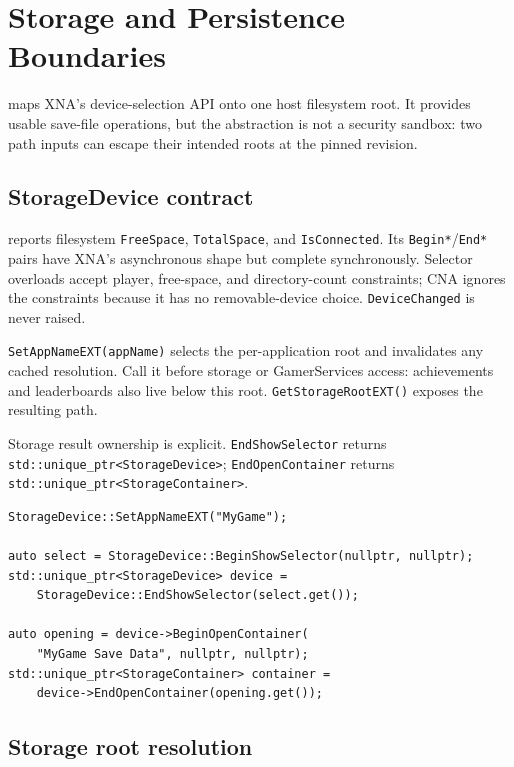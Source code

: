 \chapter{Storage and Persistence Boundaries}
\label{ch:storage}

 maps XNA's device-selection API onto one host
filesystem root. It provides usable save-file operations, but the abstraction is not a security
sandbox: two path inputs can escape their intended roots at the pinned revision.

\section{StorageDevice contract}

 reports filesystem \texttt{FreeSpace}, \texttt{TotalSpace}, and
\texttt{IsConnected}. Its \texttt{Begin*}/\texttt{End*} pairs have XNA's asynchronous shape but
complete synchronously. Selector overloads accept player, free-space, and directory-count
constraints; CNA ignores the constraints because it has no removable-device choice.
\texttt{DeviceChanged} is never raised.

\texttt{SetAppNameEXT(appName)} selects the per-application root and invalidates any cached
resolution. Call it before storage or GamerServices access: achievements and leaderboards also
live below this root. \texttt{GetStorageRootEXT()} exposes the resulting path.

Storage result ownership is explicit. \texttt{EndShowSelector} returns
\texttt{std::unique\_ptr<StorageDevice>}; \texttt{EndOpenContainer} returns
\texttt{std::unique\_ptr<StorageContainer>}.

\begin{lstlisting}
StorageDevice::SetAppNameEXT("MyGame");

auto select = StorageDevice::BeginShowSelector(nullptr, nullptr);
std::unique_ptr<StorageDevice> device =
    StorageDevice::EndShowSelector(select.get());

auto opening = device->BeginOpenContainer(
    "MyGame Save Data", nullptr, nullptr);
std::unique_ptr<StorageContainer> container =
    device->EndOpenContainer(opening.get());
\end{lstlisting}

\section{Storage root resolution}

